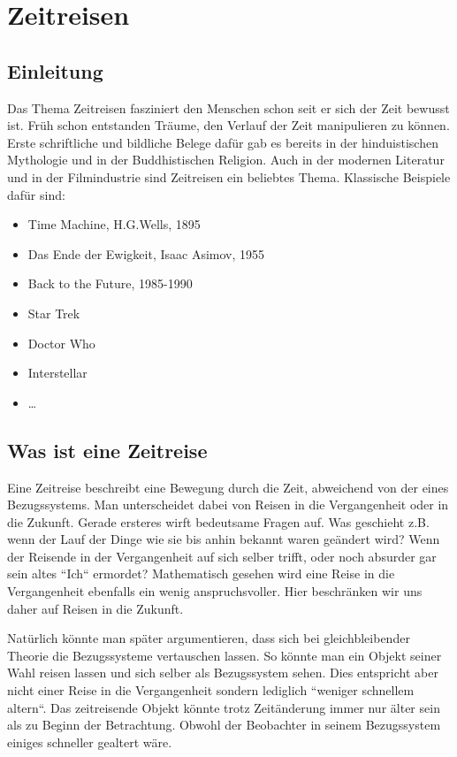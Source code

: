 \chapter{Zeitreisen\label{chapter:thema}}
\begin{refsection}

\section{Einleitung}

Das Thema Zeitreisen fasziniert den Menschen schon seit er sich der Zeit bewusst ist. Früh schon entstanden Träume, den Verlauf der Zeit manipulieren zu können. Erste schriftliche und bildliche Belege dafür gab es bereits in der hinduistischen Mythologie und in der Buddhistischen Religion. Auch in der modernen Literatur und in der Filmindustrie sind Zeitreisen ein beliebtes Thema. Klassische Beispiele daf\"ur sind: 

\begin{itemize}
    \item Time Machine, H.G.Wells, 1895 
    \item Das Ende der Ewigkeit, Isaac Asimov, 1955
    \item Back to the Future, 1985-1990
    \item Star Trek
    \item Doctor Who
    \item Interstellar
    \item \ldots
\end{itemize}

\section{Was ist eine Zeitreise}

Eine Zeitreise beschreibt eine Bewegung durch die Zeit, abweichend von der eines Bezugssystems. Man unterscheidet dabei von Reisen in die Vergangenheit oder in die Zukunft. Gerade ersteres wirft bedeutsame Fragen auf. Was geschieht z.B. wenn der Lauf der Dinge wie sie bis anhin bekannt waren geändert wird? Wenn der Reisende in der Vergangenheit auf sich selber trifft, oder noch absurder gar sein altes ``Ich`` ermordet? 
Mathematisch gesehen wird eine Reise in die Vergangenheit ebenfalls ein wenig anspruchsvoller. Hier beschränken wir uns daher auf Reisen in die Zukunft. 

Natürlich könnte man später argumentieren, dass sich bei gleichbleibender Theorie die Bezugssysteme vertauschen lassen. So könnte man ein Objekt seiner Wahl reisen lassen und sich selber als Bezugssystem sehen. Dies entspricht aber nicht einer Reise in die Vergangenheit sondern lediglich ``weniger schnellem altern``. Das zeitreisende  Objekt könnte trotz Zeit\"anderung immer nur älter sein als zu Beginn der Betrachtung. Obwohl der Beobachter in seinem Bezugssystem einiges schneller gealtert wäre.


\end{refsection}
